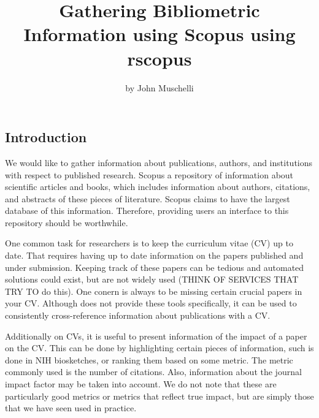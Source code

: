 \title{Gathering Bibliometric Information using Scopus using rscopus}
\author{by John Muschelli}

\maketitle



\hypertarget{introduction}{%
\subsection{Introduction}\label{introduction}}

We would like to gather information about publications, authors, and
institutions with respect to published research. Scopus a repository of
information about scientific articles and books, which includes
information about authors, citations, and abstracts of these pieces of
literature. Scopus claims to have the largest database of this
information. Therefore, providing users an interface to this repository
should be worthwhile.

One common task for researchers is to keep the curriculum vitae (CV) up
to date. That requires having up to date information on the papers
published and under submission. Keeping track of these papers can be
tedious and automated solutions could exist, but are not widely used
(THINK OF SERVICES THAT TRY TO do this). One conern is always to be
missing certain crucial papers in your CV. Although  does
not provide these tools specifically, it can be used to consistently
cross-reference information about publications with a CV.

Additionally on CVs, it is useful to present information of the impact
of a paper on the CV. This can be done by highlighting certain pieces of
information, such is done in NIH biosketches, or ranking them based on
some metric. The metric commonly used is the number of citations. Also,
information about the journal impact factor may be taken into account.
We do not note that these are particularly good metrics or metrics that
reflect true impact, but are simply those that we have seen used in
practice.

